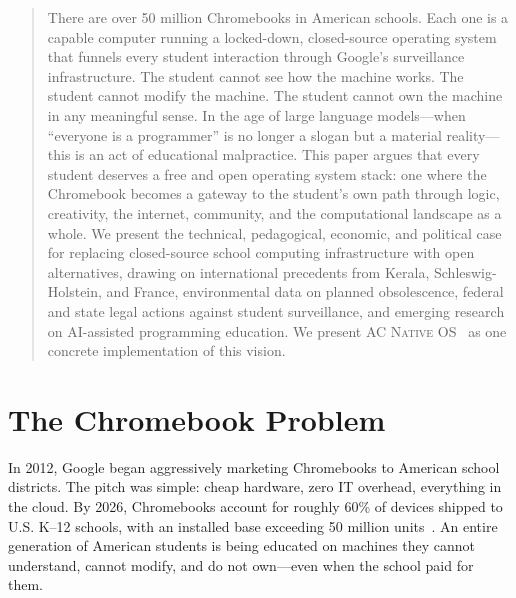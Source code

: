 \documentclass[11pt, a4paper]{article}
\newcommand{\acos}{\textsc{AC Native OS}}
\begin{document}
\begin{multicols}{2}


\begin{abstract}
\noindent
There are over 50 million Chromebooks in American schools. Each one is a capable computer running a locked-down, closed-source operating system that funnels every student interaction through Google's surveillance infrastructure. The student cannot see how the machine works. The student cannot modify the machine. The student cannot own the machine in any meaningful sense. In the age of large language models---when ``everyone is a programmer'' is no longer a slogan but a material reality---this is an act of educational malpractice. This paper argues that every student deserves a free and open operating system stack: one where the Chromebook becomes a gateway to the student's own path through logic, creativity, the internet, community, and the computational landscape as a whole. We present the technical, pedagogical, economic, and political case for replacing closed-source school computing infrastructure with open alternatives, drawing on international precedents from Kerala, Schleswig-Holstein, and France, environmental data on planned obsolescence, federal and state legal actions against student surveillance, and emerging research on AI-assisted programming education. We present \acos{}~\citep{scudder2026acos} as one concrete implementation of this vision.
\end{abstract}


\section{The Chromebook Problem}

In 2012, Google began aggressively marketing Chromebooks to American school districts. The pitch was simple: cheap hardware, zero IT overhead, everything in the cloud. By 2026, Chromebooks account for roughly 60\% of devices shipped to U.S. K--12 schools, with an installed base exceeding 50 million units~\citep{google2024chromeos}. An entire generation of American students is being educated on machines they cannot understand, cannot modify, and do not own---even when the school paid for them.


\end{multicols}
\end{document}
